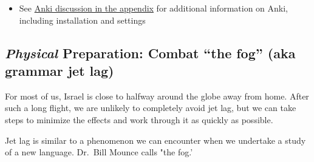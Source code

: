 \documentclass[
]{turabian-researchpaper}
\providecommand{\tightlist}{%
  \setlength{\itemsep}{0pt}\setlength{\parskip}{0pt}}
\begin{document}
\begin{itemize}
\tightlist
\item
  See \protect\hyperlink{Anki}{Anki discussion in the appendix} for additional information on Anki, including installation and settings
\end{itemize}

\hypertarget{physical-preparation-combat-the-fog-aka-grammar-jet-lag}{%
\subsection*{\texorpdfstring{\emph{Physical} Preparation: Combat ``the fog'' (aka grammar jet lag)}{Physical Preparation: Combat ``the fog'' (aka grammar jet lag)}}\label{physical-preparation-combat-the-fog-aka-grammar-jet-lag}}

For most of us, Israel is close to halfway around the globe away from home. After such a long flight, we are unlikely to completely avoid jet lag, but we can take steps to minimize the effects and work through it as quickly as possible.

Jet lag is similar to a phenomenon we can encounter when we undertake a study of a new language. Dr.~Bill Mounce calls "the fog.'
\end{document}
